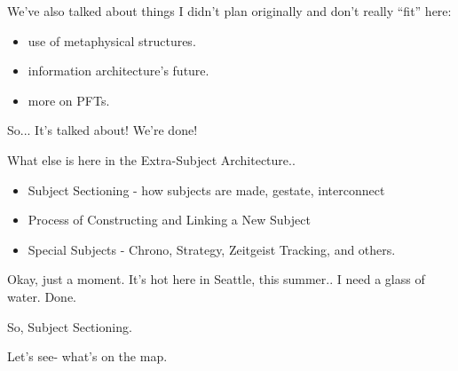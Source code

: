 \documentclass[oneside]{book}
\begin{document}
We've also talked about things I didn't plan originally and don't
really ``fit'' here:
\begin{itemize}
\item use of metaphysical structures.
\item information architecture's future.
\item more on PFTs.
\end{itemize}

So... It's talked about! We're done!

What else is here in the Extra-Subject Architecture..

\begin{itemize}
\item Subject Sectioning - how subjects are made, gestate, interconnect
\item Process of Constructing and Linking a New Subject
\item Special Subjects - Chrono, Strategy, Zeitgeist Tracking, and others.
\end{itemize}

Okay, just a moment. It's hot here in Seattle, this summer.. I need a
glass of water. Done.

So, Subject Sectioning.

Let's see- what's on the map.
\end{document}
